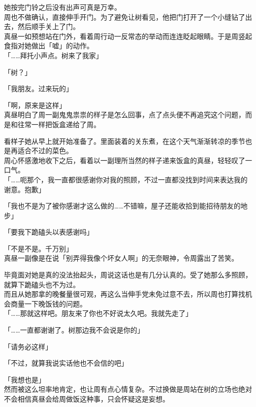 她按完门铃之后没有出声可真是万幸。\\

周也不做确认，直接伸手开门。为了避免让树看见，他把门打开了一个小缝钻了出去，然后顺手关上了门。\\

真昼一如预想站在门外，看着周行动一反常态的举动而连连眨起眼睛。于是周竖起食指对她做出「嘘」的动作。\\

「……拜托小声点。树来了我家」

「树？」

「我朋友。过来玩的」

「啊，原来是这样」\\

真昼明白了周一副鬼鬼祟祟的样子是怎么回事，点了点头便不再追究这个问题，而是和往常一样把饭盒递给了周。

看样子她从早上就开始准备了。里面装着的关东煮，在这个天气渐渐转凉的季节也是再适合不过的菜色。\\

周心怀感激地收下之后，看着以一副理所当然的样子递来饭盒的真昼，轻轻叹了一口气。\\

「……呃那个，我一直都很感谢你对我的照顾，不过一直都没找到时间来表达我的谢意。抱歉」

「我也不是为了被你感谢才这么做的……不错嘛，屋子还能收拾到能招待朋友的地步」

「要我下跪磕头以表感谢吗」

「不是不是。千万别」\\

真昼一副像是在说「别弄得我像个坏女人啊」的无奈眼神，令周露出了苦笑。

毕竟面对她是真的没法抬起头，周说这话也是有几分认真的。受了她那么多照顾，就算下跪磕头也不为过。\\

而且从她那拿的晚餐量很可观，再这么当伸手党未免过意不去，所以周也打算找机会商量一下晚饭钱的问题。\\

「……那就这样吧。朋友来了你也不好说太久吧。我就先走了」

「……一直都谢谢了。树那边我不会说是你的」

「请务必这样」

「不过，就算我说实话他也不会信的吧」

「我想也是」\\

然而被这么坦率地肯定，也让周有点心情复杂。不过换做是周站在树的立场也绝对不会相信真昼会给周做饭这种事，只会怀疑这是妄想。

